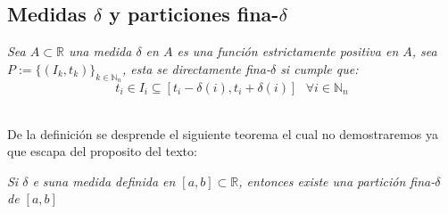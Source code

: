 \documentclass[11pt,letterpaper]{article}
\newcommand{\R}{\mathbb{R}}
\newcommand{\N}{\mathbb{N}}
\begin{document}
\subsection*{Medidas $\delta$ y particiones fina-$\delta$}
\begin{tcolorbox}[
	title = \textcolor{black}{\textcolor{white}{Definici\'on 3}},]
\textit{Sea $A\subset \R$ una medida $\delta$ en $A$ es una funci\'on estrictamente positiva en $A$, sea $P:=\{(I_k,t_k)\}_{k\in \N_n}$, esta se directamente
fina-$\delta$ si cumple que:\,\\
\begin{equation*}
    t_i\in I_i\subseteq [t_i-\delta(i),t_i+\delta(i)]\,\,\,\,\forall i\in \N_n
\end{equation*}}
\end{tcolorbox}\,\\
De la definici\'on se desprende el siguiente teorema el cual no demostraremos ya que escapa del proposito del texto:
\begin{tcolorbox}[
	title = \textcolor{black}{\textcolor{white}{Teorema 5}},]
\textit{Si $\delta$ e suna medida definida en $[a,b]\subset \R$, entonces existe
una partici\'on fina-$\delta$ de $[a,b]$}
\end{tcolorbox}
\newpage
\,\\
\end{document}
